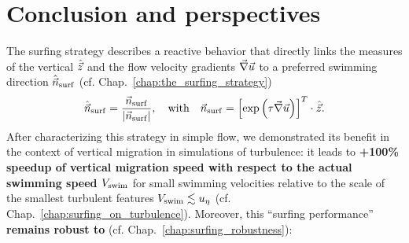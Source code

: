 \chapter{Conclusion and perspectives}\label{chap:perspectives}

The surfing strategy describes a reactive behavior that directly links the measures of the vertical $\hat{\vec{z}}$ and the flow velocity gradients $\vec{\nabla} \vec{u}$ to a preferred swimming direction $\hat{\vec{n}}_{\mathrm{surf}}$ (cf. Chap.~\ref{chap:the_surfing_strategy})
\begin{equation}
	\label{end:eq:surfing_swimming_direction_final}
	\hat{\vec{n}}_{\mathrm{surf}} = \frac{\vec{n}_{\mathrm{surf}}}{\lvert\vec{n}_{\mathrm{surf}}\rvert}, \quad \text{with} \quad \vec{n}_{\mathrm{surf}} = \left[ \exp \left( \tau \vec{\nabla} \vec{u} \right) \right]^T \cdot \hat{\vec{z}}.
\end{equation}
After characterizing this strategy in simple flow, we demonstrated its benefit in the context of vertical migration in simulations of turbulence: it leads to \textbf{+100\% speedup of vertical migration speed with respect to the actual swimming speed $V_{\mathrm{swim}}$} for small swimming velocities relative to the scale of the smallest turbulent features $V_{\mathrm{swim}} \lesssim u_{\eta}$ (cf. Chap.~\ref{chap:surfing_on_turbulence}).
Moreover, this ``surfing performance'' \textbf{remains robust to} (cf. Chap.~\ref{chap:surfing_robustness}):
